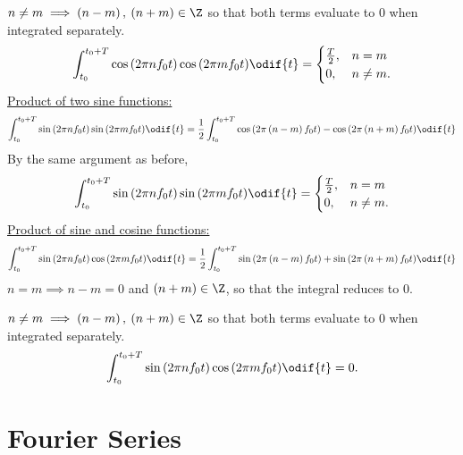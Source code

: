 \documentclass{article}
\begin{document}
\(n \neq m \implies \left( n - m \right),\: \left( n + m \right) \in \Z\) so that both terms evaluate to \(0\) when integrated separately.
\begin{equation*}
    \int_{t_0}^{t_0 + T} \cos{\left( 2\pi n f_0 t \right)} \cos{\left( 2\pi m f_0 t \right)} \odif{t} = \begin{cases}
        \frac{T}{2}, & n = m     \\
        0,           & n \neq m.
    \end{cases}
\end{equation*}
\underline{Product of two sine functions:}
\begin{equation*}
    \int_{t_0}^{t_0 + T} \sin{\left( 2\pi n f_0 t \right)} \sin{\left( 2\pi m f_0 t \right)} \odif{t} = \frac{1}{2} \int_{t_0}^{t_0 + T} \cos{\left( 2 \pi \left( n - m \right) f_0 t \right)} - \cos{\left( 2 \pi \left( n + m \right) f_0 t \right)} \odif{t}
\end{equation*}
By the same argument as before,
\begin{equation*}
    \int_{t_0}^{t_0 + T} \sin{\left( 2\pi n f_0 t \right)} \sin{\left( 2\pi m f_0 t \right)} \odif{t} = \begin{cases}
        \frac{T}{2}, & n = m     \\
        0,           & n \neq m.
    \end{cases}
\end{equation*}
\underline{Product of sine and cosine functions:}
\begin{equation*}
    \int_{t_0}^{t_0 + T} \sin{\left( 2\pi n f_0 t \right)} \cos{\left( 2\pi m f_0 t \right)} \odif{t} = \frac{1}{2} \int_{t_0}^{t_0 + T} \sin{\left( 2 \pi \left( n - m \right) f_0 t \right)} + \sin{\left( 2 \pi \left( n + m \right) f_0 t \right)} \odif{t}
\end{equation*}
\(n = m \implies n - m = 0\) and \(\left( n + m \right) \in \Z\), so that the integral reduces to \(0\).

\(n \neq m \implies \left( n - m \right),\: \left( n + m \right) \in \Z\) so that both terms evaluate to \(0\) when integrated separately.
\begin{equation*}
    \int_{t_0}^{t_0 + T} \sin{\left( 2\pi n f_0 t \right)} \cos{\left( 2\pi m f_0 t \right)} \odif{t} = 0.
\end{equation*}
\section{Fourier Series}
\end{document}
